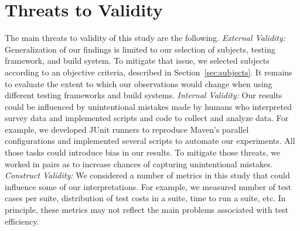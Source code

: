 \section{Threats to Validity}

The main threats to validity of this study are the following.
\textit{External Validity:} Generalization of our findings is limited
to our selection of subjects, testing framework, and build system.  To
mitigate that issue, we selected subjects according to an objective
criteria, described in Section~\ref{sec:subjects}.  It remains to
evaluate the extent to which our observations would change when using
different testing frameworks and build systems.  \textit{Internal
  Validity:} Our results could be influenced by unintentional mistakes
made by humans who interpreted survey data and implemented scripts and
code to collect and analyze data. For example, we developed JUnit
runners to reproduce Maven's parallel configurations and implemented
several scripts to automate our experiments.  All those tasks
could introduce bias in our results.  To mitigate those threats, we
worked in pairs as to increase chances of capturing unintentional
mistakes. 
\textit{Construct Validity:} We considered a number of metrics in this
study that could influence some of our interpretations.  For example,
we measured number of test cases per suite, distribution of test costs
in a suite, time to run a suite, etc.  In principle, these metrics may
not reflect the main problems associated with test
efficiency.

